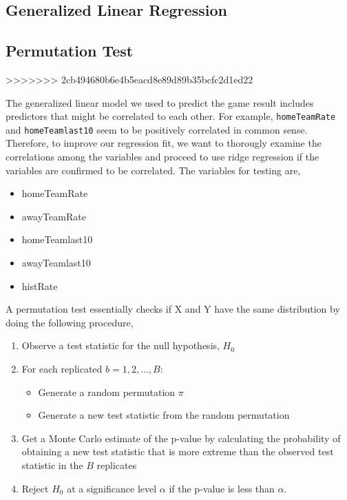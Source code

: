 \documentclass[]{article}
\providecommand{\tightlist}{%
  \setlength{\itemsep}{0pt}\setlength{\parskip}{0pt}}
\begin{document}
\subsection{Generalized Linear
Regression}\label{generalized-linear-regression}

\subsection{Permutation Test}\label{permutation-test}
>>>>>>> 2cb494680b6e4b5eacd8e89d89b35bcfc2d1ed22

The generalized linear model we used to predict the game result includes
predictors that might be correlated to each other. For example,
\texttt{homeTeamRate} and \texttt{homeTeamlast10} seem to be positively
correlated in common sense. Therefore, to improve our regression fit, we
want to thorougly examine the correlations among the variables and
proceed to use ridge regression if the variables are confirmed to be
correlated. The variables for testing are,

\begin{itemize}
\tightlist
\item
  homeTeamRate
\item
  awayTeamRate
\item
  homeTeamlast10
\item
  awayTeamlast10
\item
  histRate
\end{itemize}

A permutation test essentially checks if X and Y have the same
distribution by doing the following procedure,

\begin{enumerate}
\def\labelenumi{\arabic{enumi}.}
\tightlist
\item
  Observe a test statistic for the null hypothesis, \(H_0\)
\item
  For each replicated \(b = 1, 2,..., B\):

  \begin{itemize}
  \tightlist
  \item
    Generate a random permutation \(\pi\)
  \item
    Generate a new test statistic from the random permutation
  \end{itemize}
\item
  Get a Monte Carlo estimate of the p-value by calculating the
  probability of obtaining a new test statistic that is more extreme
  than the observed test statistic in the \(B\) replicates
\item
  Reject \(H_0\) at a significance level \(\alpha\) if the p-value is
  less than \(\alpha\).
\end{enumerate}
\end{document}
